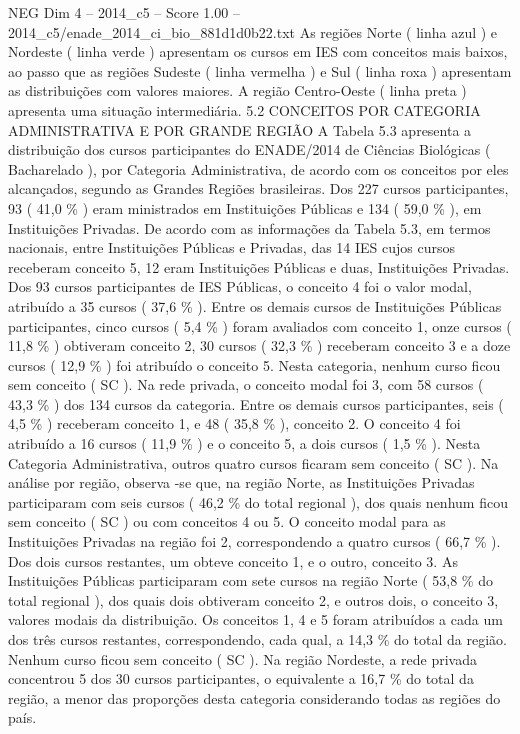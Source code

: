 \begin{textsample}{NEG Dim 4 – 2014\_c5 – Score 1.00 – 2014\_c5/enade\_2014\_ci\_bio\_881d1d0b22.txt}
As regiões Norte ( linha azul ) e Nordeste ( linha verde ) apresentam os cursos em IES com conceitos mais baixos, ao passo que as regiões Sudeste ( linha vermelha ) e Sul ( linha roxa ) apresentam as distribuições com valores maiores.
A região Centro-Oeste ( linha preta ) apresenta uma situação intermediária. 5.2 CONCEITOS POR CATEGORIA ADMINISTRATIVA E POR GRANDE REGIÃO A Tabela 5.3 apresenta a distribuição dos cursos participantes do ENADE/2014 de Ciências Biológicas ( Bacharelado ), por Categoria Administrativa, de acordo com os conceitos por eles alcançados, segundo as Grandes Regiões brasileiras.
Dos 227 cursos participantes, 93 ( 41,0 \% ) eram ministrados em Instituições Públicas e 134 ( 59,0 \% ), em Instituições Privadas.
De acordo com as informações da Tabela 5.3, em termos nacionais, entre Instituições Públicas e Privadas, das 14 IES cujos cursos receberam conceito 5, 12 eram Instituições Públicas e duas, Instituições Privadas.
Dos 93 cursos participantes de IES Públicas, o conceito 4 foi o valor modal, atribuído a 35 cursos ( 37,6 \% ).
Entre os demais cursos de Instituições Públicas participantes, cinco cursos ( 5,4 \% ) foram avaliados com conceito 1, onze cursos ( 11,8 \% ) obtiveram conceito 2, 30 cursos ( 32,3 \% ) receberam conceito 3 e a doze cursos ( 12,9 \% ) foi atribuído o conceito 5.
Nesta categoria, nenhum curso ficou sem conceito ( SC ).
Na rede privada, o conceito modal foi 3, com 58 cursos ( 43,3 \% ) dos 134 cursos da categoria.
Entre os demais cursos participantes, seis ( 4,5 \% ) receberam conceito 1, e 48 ( 35,8 \% ), conceito 2.
O conceito 4 foi atribuído a 16 cursos ( 11,9 \% ) e o conceito 5, a dois cursos ( 1,5 \% ).
Nesta Categoria Administrativa, outros quatro cursos ficaram sem conceito ( SC ).
Na análise por região, observa -se que, na região Norte, as Instituições Privadas participaram com seis cursos ( 46,2 \% do total regional ), dos quais nenhum ficou sem conceito ( SC ) ou com conceitos 4 ou 5.
O conceito modal para as Instituições Privadas na região foi 2, correspondendo a quatro cursos ( 66,7 \% ).
Dos dois cursos restantes, um obteve conceito 1, e o outro, conceito 3.
As Instituições Públicas participaram com sete cursos na região Norte ( 53,8 \% do total regional ), dos quais dois obtiveram conceito 2, e outros dois, o conceito 3, valores modais da distribuição.
Os conceitos 1, 4 e 5 foram atribuídos a cada um dos três cursos restantes, correspondendo, cada qual, a 14,3 \% do total da região.
Nenhum curso ficou sem conceito ( SC ).
Na região Nordeste, a rede privada concentrou 5 dos 30 cursos participantes, o equivalente a 16,7 \% do total da região, a menor das proporções desta categoria considerando todas as regiões do país.

\end{textsample}
